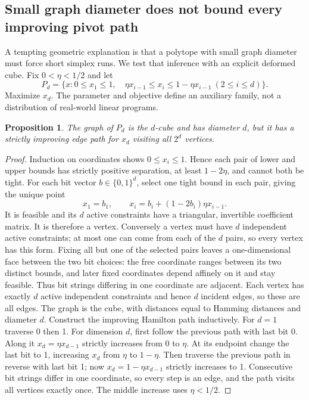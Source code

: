 \documentclass[11pt]{article}
\newtheorem{proposition}{Proposition}
\begin{document}
\subsection{Small graph diameter does not bound every improving pivot path}
A tempting geometric explanation is that a polytope with small graph diameter must force short simplex runs. We test that inference with an explicit deformed cube. Fix $0<\eta<1/2$ and let
\[
P_d=\{x:0\le x_1\le1,\quad \eta x_{i-1}\le x_i\le1-\eta x_{i-1}\ (2\le i\le d)\}.
\]
Maximize $x_d$. The parameter and objective define an auxiliary family, not a distribution of real-world linear programs.
\begin{proposition}
The graph of $P_d$ is the $d$-cube and has diameter $d$, but it has a strictly improving edge path for $x_d$ visiting all $2^d$ vertices.
\end{proposition}
\begin{proof}
Induction on coordinates shows $0\le x_i\le1$. Hence each pair of lower and upper bounds has strictly positive separation, at least $1-2\eta$, and cannot both be tight. For each bit vector $b\in\{0,1\}^d$, select one tight bound in each pair, giving the unique point
\[
x_1=b_1,\qquad x_i=b_i+(1-2b_i)\eta x_{i-1}.
\]
It is feasible and its $d$ active constraints have a triangular, invertible coefficient matrix. It is therefore a vertex. Conversely a vertex must have $d$ independent active constraints; at most one can come from each of the $d$ pairs, so every vertex has this form. Fixing all but one of the selected pairs leaves a one-dimensional face between the two bit choices: the free coordinate ranges between its two distinct bounds, and later fixed coordinates depend affinely on it and stay feasible. Thus bit strings differing in one coordinate are adjacent. Each vertex has exactly $d$ active independent constraints and hence $d$ incident edges, so these are all edges. The graph is the cube, with distances equal to Hamming distances and diameter $d$.
Construct the improving Hamilton path inductively. For $d=1$ traverse 0 then 1. For dimension $d$, first follow the previous path with last bit 0. Along it $x_d=\eta x_{d-1}$ strictly increases from 0 to $\eta$. At its endpoint change the last bit to 1, increasing $x_d$ from $\eta$ to $1-\eta$. Then traverse the previous path in reverse with last bit 1; now $x_d=1-\eta x_{d-1}$ strictly increases to 1. Consecutive bit strings differ in one coordinate, so every step is an edge, and the path visits all vertices exactly once. The middle increase uses $\eta<1/2$.
\end{proof}
\end{document}
